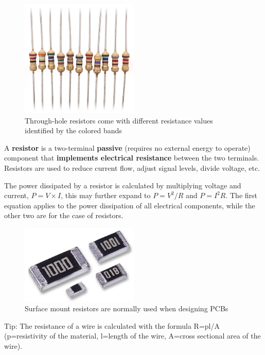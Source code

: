 \documentclass{article}
\begin{document}
\begin{figure}[h]
    \centering
    \includegraphics[width=0.5\textwidth]{img/resistors-thru-hole.jpg}
    \caption{Through-hole resistors come with different resistance values identified by the colored bands}
    \label{fig:res-thru}
\end{figure}

A \textbf{resistor} is a two-terminal \textbf{passive} (requires no external energy to operate) component that \textbf{implements electrical resistance} between the two terminals. Resistors are used to reduce current flow, adjust signal levels, divide voltage, etc.

The power dissipated by a resistor is calculated by multiplying voltage and current, $P =V \times I$, this may further expand to $P =V^{2}/R$ and $P= I^2R$. The first equation applies to the power dissipation of all electrical components, while the other two are for the case of resistors.

\begin{figure}[h]
    \centering
    \includegraphics[width=0.5\textwidth]{img/resistors-smd.jpg}
    \caption{Surface mount resistors are normally used when designing PCBs}
    \label{fig:res-smd}
\end{figure}

Tip: The resistance of a wire is calculated with the formula R=pl/A (p=resistivity of the material, l=length of the wire, A=cross sectional area of the wire).
\end{document}
